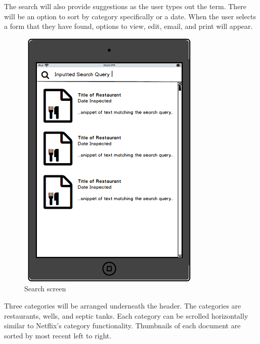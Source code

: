 \documentclass[twoside,letterpaper]{article}
\begin{document}
{\noindent The search will also provide suggestions as the user types out the term. There will be an option to sort by category specifically or a date. When the user selects a form that they have found,  options to view, edit, email, and print will appear.

\begin{figure}[h]
\centering
\includegraphics[width=3.5in,height=5in]{Search.png}
\caption{Search screen}
\end{figure}
\newpage
\noindent Three categories will be arranged underneath the header. The categories are restaurants, wells, and septic tanks. Each category can be scrolled horizontally similar to Netflix's category functionality. Thumbnails of each document are sorted by most recent left to right. 

}
\end{document}
